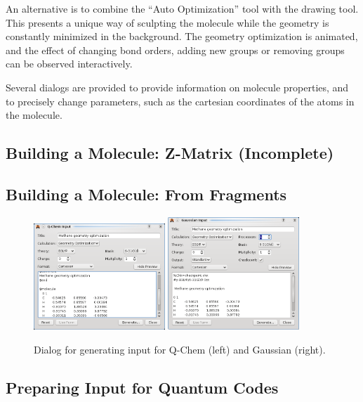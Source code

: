 \documentclass{article}
\begin{document}
An alternative is to combine the ``Auto Optimization'' tool with the drawing tool. This presents a unique way of sculpting the molecule while the geometry is constantly minimized in the background. The geometry optimization is animated, and the effect of changing bond orders, adding new groups or removing groups can be observed interactively.

Several dialogs are provided to provide information on molecule properties, and to precisely change parameters, such as the cartesian coordinates of the atoms in the molecule.

\subsection{Building a Molecule: Z-Matrix (Incomplete)}

\subsection{Building a Molecule: From Fragments}

\begin{figure}
	\includegraphics[width=0.44\textwidth]{images/avogadro-q-chem}
	\hspace{0.1cm}
	\includegraphics[width=0.44\textwidth]{images/avogadro-gaussian}
	\caption{Dialog for generating input for Q-Chem (left) and Gaussian (right).}
	\label{f:quantumdialogs}
\end{figure}

\subsection{Preparing Input for Quantum Codes}
\end{document}
